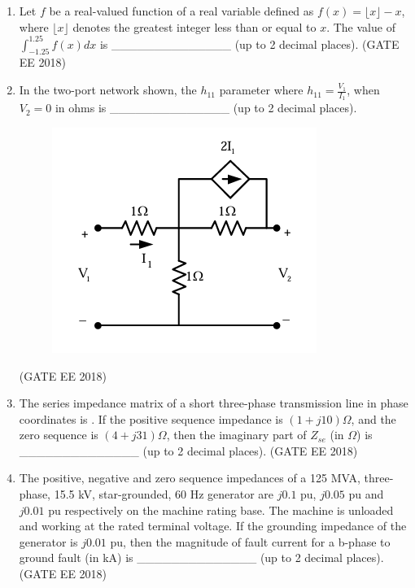 \documentclass[journal,12pt,onecolumn]{IEEEtran}
\theoremstyle{remark}
\begin{document}
\begin{enumerate}
    \item Let $f$ be a real-valued function of a real variable defined as $f(x) = \lfloor x \rfloor - x$, where $\lfloor x \rfloor$ denotes the greatest integer less than or equal to $x$. The value of $\int_{-1.25}^{1.25} f(x) dx$ is \_\_\_\_\_\_\_\_\_\_\_\_\_\_ (up to 2 decimal places).
    \hfill{(GATE EE 2018)}

    \item In the two-port network shown, the $h_{11}$ parameter where $h_{11} = \frac{V_{1}}{I_{1}}$, when $V_{2}=0$ in ohms is \_\_\_\_\_\_\_\_\_\_\_\_\_\_ (up to 2 decimal places).
   \begin{figure}[H]
    \centering
    \includegraphics[]{figs/Q.19.png}
    \caption{}
    \label{fig:6}
\end{figure}
\hfill{(GATE EE 2018)}

    \item The series impedance matrix of a short three-phase transmission line in phase coordinates is 
. If the positive sequence impedance is $(1 + j10) \Omega$, and the zero sequence is $(4 + j31) \Omega$, then the imaginary part of $Z_{se}$ (in $\Omega$) is \_\_\_\_\_\_\_\_\_\_\_\_\_\_ (up to 2 decimal places).
   \hfill{(GATE EE 2018)} 

    \item The positive, negative and zero sequence impedances of a 125 MVA, three-phase, 15.5 kV, star-grounded, 60 Hz generator are $j0.1$ pu, $j0.05$ pu and $j0.01$ pu respectively on the machine rating base. The machine is unloaded and working at the rated terminal voltage. If the grounding impedance of the generator is $j0.01$ pu, then the magnitude of fault current for a b-phase to ground fault (in kA) is \_\_\_\_\_\_\_\_\_\_\_\_\_\_ (up to 2 decimal places).
  \hfill{(GATE EE 2018)}  
    

\end{enumerate}
\end{document}
